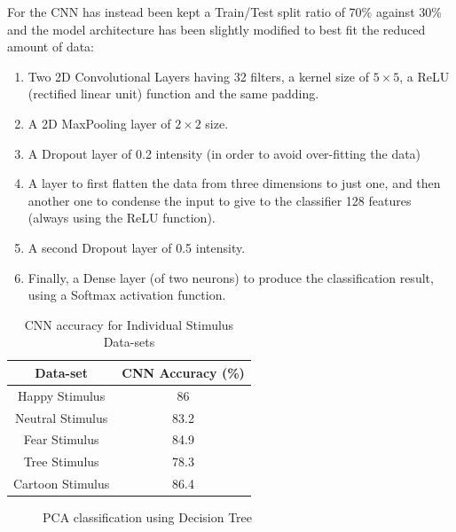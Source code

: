\begin{appendices}
For the CNN has instead been kept a Train/Test split ratio of 70\% against 30\% and the model architecture has been slightly modified to best fit the reduced amount of data:

\begin{enumerate}
\itemsep0em
\item Two 2D Convolutional Layers having 32 filters, a kernel size of $5\times5$, a ReLU (rectified linear unit) function and the same padding. 
\item A 2D MaxPooling layer of $2\times2$ size.
\item A Dropout layer of 0.2 intensity (in order to avoid over-fitting the data)
\item A layer to first flatten the data from three dimensions to just one, and then another one to condense the input to give to the classifier 128 features (always using the ReLU function).
\item A second Dropout layer of 0.5 intensity.
\item Finally, a Dense layer (of two neurons) to produce the classification result, using a Softmax activation function.
\end{enumerate}

{
\begin{table}[h!]
\centering
\begin{tabular}{|c|c|}
\hline
Data-set &CNN Accuracy (\%) \\
\hline
Happy Stimulus & 86  \\
Neutral Stimulus & 83.2  \\
Fear Stimulus & 84.9  \\
Tree Stimulus & 78.3 \\
Cartoon Stimulus & 86.4 \\
\hline
\end{tabular}
\caption{CNN accuracy for Individual Stimulus Data-sets}
\label{table:1}
\end{table}
}

\begin{figure}[ht!]%
    \centering
    \qquad
    \qquad
    \caption{PCA classification using Decision Tree}%
    \label{fig:example2}%
\end{figure}


\end{appendices}
